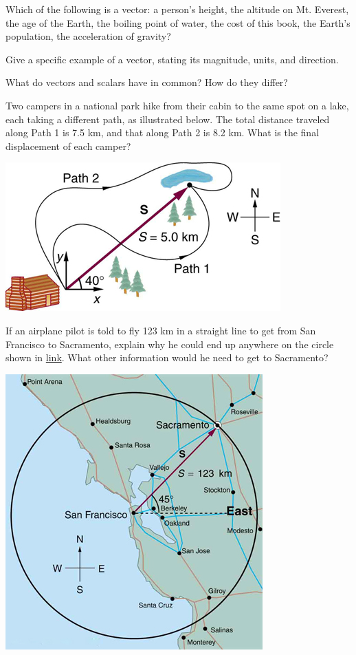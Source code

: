 \documentclass[
]{book}
\begin{document}
\hypertarget{fs-id1165298732767}{}
\leavevmode{}%
Which of the following is a vector: a person's height, the altitude on
Mt. Everest, the age of the Earth, the boiling point of water, the cost
of this book, the Earth's population, the acceleration of gravity?

\hypertarget{fs-id1165298775836}{}
\leavevmode{}%
Give a specific example of a vector, stating its magnitude, units, and
direction.

\hypertarget{fs-id1165298783616}{}
\leavevmode{}%
What do vectors and scalars have in common? How do they differ?

\hypertarget{fs-id1165296576944}{}
\leavevmode{}%
Two campers in a national park hike from their cabin to the same spot on
a lake, each taking a different path, as illustrated below. The total
distance traveled along Path 1 is 7.5 km, and that along Path 2 is 8.2
km. What is the final displacement of each camper?

\includegraphics{images/Figure_03_02_18a.jpg}

\hypertarget{fs-id1165298981819}{}
\leavevmode{}%
If an airplane pilot is told to fly 123 km in a straight line to get
from San Francisco to Sacramento, explain why he could end up anywhere
on the circle shown in
\protect\hyperlink{import-auto-id1165296384452}{link}. What other
information would he need to get to Sacramento?

\includegraphics{images/Figure_03_02_19a.jpg}
\end{document}
